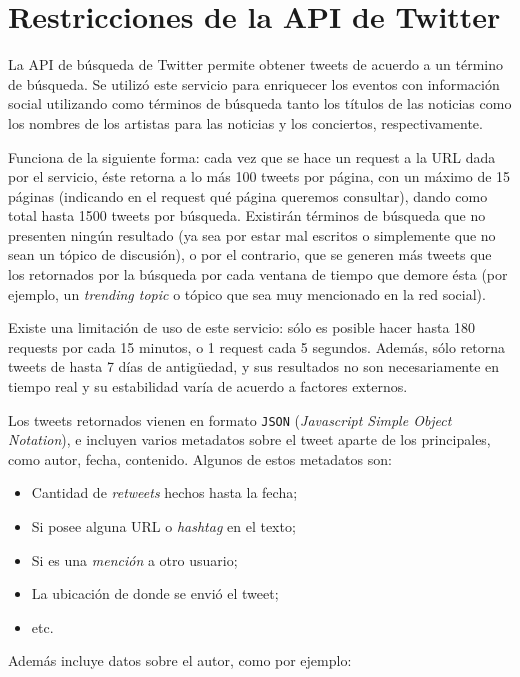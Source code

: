 \documentclass[upright, contnum]{umemoria}
\begin{document}
\section{Restricciones de la API de Twitter}
\label{sec-4.5}


   La API de búsqueda de Twitter permite obtener tweets de acuerdo a un
   término de búsqueda. Se utilizó este servicio para enriquecer los
   eventos con información social utilizando como términos de búsqueda
   tanto los títulos de las noticias como los nombres de los artistas
   para las noticias y los conciertos, respectivamente. 
   
   Funciona de la siguiente forma: cada vez que se hace un request a la
   URL dada por el servicio, éste retorna a lo más 100 tweets por página, con un
   máximo de 15 páginas (indicando en el request qué página queremos
   consultar), dando como total hasta 1500 tweets por búsqueda. Existirán
   términos de búsqueda que no presenten ningún resultado  (ya sea por
   estar mal escritos o simplemente que no sean un tópico de discusión), o por
   el contrario, que se generen más tweets que los retornados por la
   búsqueda por cada ventana de tiempo que demore ésta (por ejemplo, un
   \emph{trending topic} o tópico que sea muy mencionado en la red social).
   
   Existe una limitación de uso de este servicio: sólo es posible hacer
   hasta 180 requests por cada 15 minutos, o 1 request cada 5
   segundos. Además, sólo retorna tweets de hasta 7 días de antigüedad, y
   sus resultados no son necesariamente en tiempo real y su estabilidad
   varía de acuerdo a factores externos.
   
   Los tweets retornados vienen en formato \texttt{JSON} (\emph{Javascript Simple Object Notation}),
   e incluyen varios metadatos sobre el tweet aparte de los principales,
   como autor, fecha, contenido. Algunos de estos metadatos son:
   
\begin{itemize}
\item Cantidad de \emph{retweets} hechos hasta la fecha;
\item Si posee alguna URL o \emph{hashtag} en el texto;
\item Si es una \emph{mención} a otro usuario;
\item La ubicación de donde se envió el tweet;
\item etc.
\end{itemize}
  Además incluye datos sobre el autor, como por ejemplo:
\end{document}
